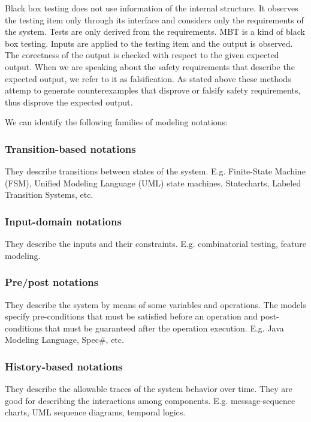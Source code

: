Black box testing does not use information of the internal structure. It observes the testing item only through its interface and considers only the requirements of the system. Tests are only derived from the requirements. MBT is a kind of black box testing. Inputs are applied to the testing item and the output is observed. The corectness of the output is checked with respect to the given expected output. When we are speaking about the safety requirements that describe the expected output, we refer to it as falsification. As stated above these methods attemp to generate counterexamples that disprove or falsify safety requirements, thus disprove the expected output.

We can identify the following families of modeling notations:

\subsubsection{Transition-based notations}

They describe transitions between states of the system. E.g. Finite-State Machine (FSM), Unified Modeling Language (UML) state machines, Statecharts, Labeled Transition Systems, etc.

\subsubsection{Input-domain notations}

They describe the inputs and their constraints. E.g. combinatorial testing, feature modeling.

\subsubsection{Pre/post notations}

They describe the system by means of some variables and operations. The models specify pre-conditions that must be satisfied before an operation and post-conditions that must be guaranteed after the operation execution. E.g. Java Modeling Language, Spec\#, etc.

\subsubsection{History-based notations}

They describe the allowable traces of the system behavior over time. They are good for describing the interactions among components. E.g. message-sequence charts, UML sequence diagrams, temporal logics.

